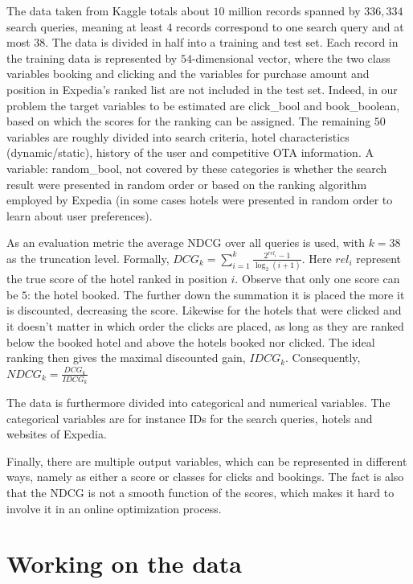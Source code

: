 \documentclass{llncs}
\begin{document}
The data taken from Kaggle totals about $10$ million records spanned by $336,334$ search queries, meaning at least $4$ records correspond to one search query and at most $38$. The data is divided in half into a training and test set. Each record in the training data is represented by $54$-dimensional vector, where the two class variables booking and clicking and the variables for purchase amount and position in Expedia's ranked list are not included in the test set. Indeed, in our problem the target variables to be estimated are click\_bool and book\_boolean, based on which the scores for the ranking can be assigned. The remaining $50$ variables are roughly divided into search criteria, hotel characteristics (dynamic/static), history of the user and competitive OTA information. A variable: random\_bool, not covered by these categories is whether the search result were presented in random order or based on the ranking algorithm employed by Expedia (in some cases hotels were presented in random order to learn about user preferences).

As an evaluation metric the average NDCG over all queries is used, with $k=38$ as the truncation level. Formally, $\displaystyle DCG_{k}=\sum_{i=1}^{k}\frac{2^{rel_i}-1}{\log_{2}(i+1)}$. Here $rel_{i}$ represent the true score of the hotel ranked in position $i$. Observe that only one score can be $5$: the hotel booked. The further down the summation it is placed the more it is discounted, decreasing the score. Likewise for the hotels that were clicked and it doesn't matter in which order the clicks are placed, as long as they are ranked below the booked hotel and above the hotels booked nor clicked. The ideal ranking then gives the maximal discounted gain, $IDCG_{k}$. Consequently, $NDCG_{k}=\frac{DCG_{k}}{IDCG_{k}}$ 

The data is furthermore divided into categorical and numerical variables. The categorical variables are for instance IDs for the search queries, hotels and websites of Expedia.  

Finally, there are multiple output variables, which can be represented in different ways, namely as either a score or classes for clicks and bookings. The fact is also that the NDCG is not a smooth function of the scores, which makes it hard to involve it in an online optimization process.        


\section{Working on the data}
\label{sec:working_on_data}
\end{document}
